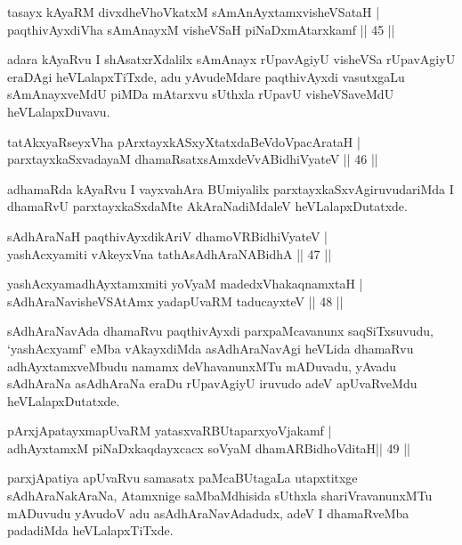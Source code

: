 \begin{shl}
tasayx kAyaRM divxdheVhoVkatxM sAmAnAyxtamxvisheVSataH |\\
paqthivAyxdiVha sAmAnayxM visheVSaH piNaDxmAtarxkamf \hfill || 45 ||
\end{shl}

\begin{artha}
adara kAyaRvu I shAsatxrXdalilx sAmAnayx rUpavAgiyU visheVSa rUpavAgiyU eraDAgi heVLalapxTiTxde, adu yAvudeMdare paqthivAyxdi vasutxgaLu sAmAnayxveMdU piMDa mAtarxvu sUthxla rUpavU visheVSaveMdU heVLalapxDuvavu.
\end{artha}

\begin{shl}
tatAkxyaRseyxVha pArxtayxkASxyXtatxdaBeVdoVpacArataH |\\
parxtayxkaSxvadayaM dhamaRsatxsAmxdeVvABidhiVyateV \hfill || 46 ||
\end{shl}

\begin{artha}
adhamaRda kAyaRvu I vayxvahAra BUmiyalilx parxtayxkaSxvAgiruvudariMda I dhamaRvU parxtayxkaSxdaMte AkAraNadiMdaleV heVLalapxDutatxde.
\end{artha}

\begin{shl}
sAdhAraNaH paqthivAyxdikAriV dhamoVR\s BidhiVyateV |\\
yashAcxyamiti vAkeyxVna tathA\s sAdhAraNABidhA \hfill || 47 ||
\end{shl}
\begin{shl}
yashAcxyamadhAyxtamxmiti yoV\s yaM madedxVhakaqnamxtaH |\\
sAdhAraNavisheVSAtAmx yadapUvaRM taducayxteV \hfill || 48 ||
\end{shl}

\begin{artha}
sAdhAraNavAda dhamaRvu paqthivAyxdi parxpaMcavanunx saqSiTxsuvudu, `yashAcxyamf' eMba vAkayxdiMda asAdhAraNavAgi heVLida dhamaRvu adhAyxtamxveMbudu namamx deVhavanunxMTu mADuvadu, yAvadu sAdhAraNa asAdhAraNa  eraDu rUpavAgiyU iruvudo adeV apUvaRveMdu heVLalapxDutatxde.
\end{artha}

\begin{shl}
pArxjApatayxmapUvaRM yatasxvaRBUtaparxyoVjakamf |\\
adhAyxtamxM piNaDxkaqdayxcacx soV\s yaM dhamARBidhoVditaH\hfill  || 49 ||
\end{shl}

\begin{artha}
parxjApatiya apUvaRvu samasatx paMcaBUtagaLa utapxtitxge
sAdhAraNakAraNa, Atamxnige saMbaMdhisida sUthxla shariVravanunxMTu
mADuvudu yAvudoV adu asAdhAraNavAdadudx, adeV I dhamaRveMba padadiMda heVLalapxTiTxde.
\end{artha}

